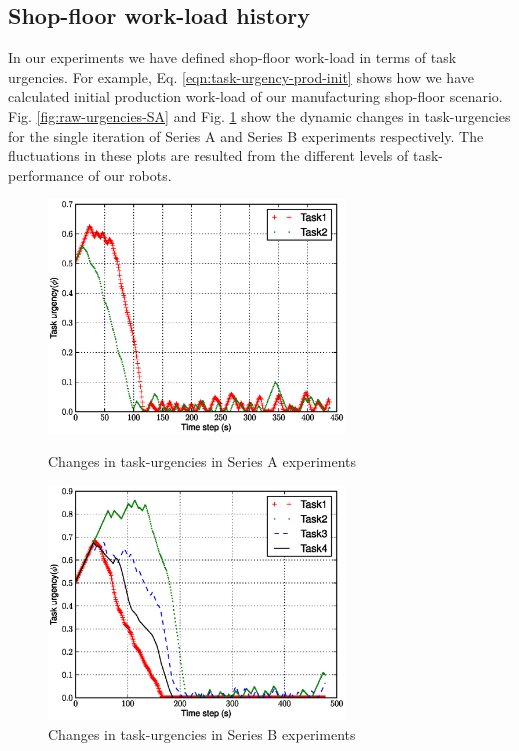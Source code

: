 \documentclass[smallcondensed]{svjour3}
\begin{document}
\subsection*{Shop-floor work-load history}
In our experiments we have defined shop-floor work-load in terms of task urgencies. For example, Eq. \ref{eqn:task-urgency-prod-init} shows how we have calculated initial production work-load of our manufacturing shop-floor scenario. Fig. \ref{fig:raw-urgencies-SA} and Fig. \ref{fig:raw-urgencies-SB}  show the dynamic changes in task-urgencies for the single iteration of Series A and Series B experiments respectively. The fluctuations in these plots are resulted from the different levels of task-performance of our robots.
\begin{figure}
\centering
\includegraphics[width=0.7\textwidth, angle=0]
{images/global-8robots/PlotUrgencyLog-2010Apr30-095755.eps}
\caption{\small Changes in task-urgencies in Series A experiments}
\label{fig:raw-urgencies-SA} 
\centering
\includegraphics[width=0.7\textwidth, angle=0]{images/PlotUrgencyLog-2010May10-115549.eps}
\caption{\small Changes in task-urgencies in Series B experiments} 
\label{fig:raw-urgencies-SB} 
\end{figure}
\end{document}
